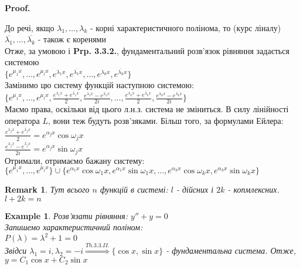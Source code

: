 \documentclass[a4paper, 10pt]{article}
\makeatletter
\def\qed{$\blacksquare$}
\theoremstyle{theoremdd}
\theoremstyle{theoremdd}
\theoremstyle{theoremdd}
\theoremstyle{theoremdd}
\newtheorem{example}[theorem]{Example}
\theoremstyle{theoremdd}
\theoremstyle{theoremdd}
\newtheorem{remark}[theorem]{Remark}
\theoremstyle{theoremdd}
\theoremstyle{theoremdd}
\renewenvironment{proof}[1][Proof.\\]{\par
\pushQED{\hfill \qed}%
\normalfont \topsep6\p@\@plus6\p@\relax
\trivlist
\item\relax
{\bfseries
#1\@addpunct{.}}\hspace\labelsep\ignorespaces
}{%
\popQED\endtrivlist\@endpefalse
}
\makeatother
\begin{document}
\begin{proof}
До речі, якщо $\lambda_1, \dots, \lambda_k$ - корні характеристичного полінома, то (курс ліналу) $\overline{\lambda_1}, \dots, \overline{\lambda_k}$ - також є коренями\\
Отже, за умовою і \textbf{Prp. 3.3.2.}, фундаментальний розв'язок рівняння задається системою\\
$\{e^{\mu_1 x}, \dots, e^{\mu_l x}, e^{\lambda_1 x}, e^{\overline{\lambda_1} x}, \dots, e^{\lambda_k x}, e^{\overline{\lambda_k} x}\}$\\
Замінимо цю систему функцій наступною системою:\\
$\displaystyle \{e^{\mu_1 x}, \dots, e^{\mu_l x}, \frac{e^{\lambda_1 x} + e^{\overline{\lambda_1} x}}{2}, \frac{e^{\lambda_1 x} - e^{\overline{\lambda_1} x}}{2i}, \dots, \frac{e^{\lambda_k x} + e^{\overline{\lambda_k} x}}{2}, \frac{e^{\lambda_k x} - e^{\overline{\lambda_k} x}}{2i}\}$\\
Маємо права, оскільки від цього л.н.з. система не зміниться. В силу лінійності оператора $L$, вони теж будуть розв'зяками. Більш того, за формулами Ейлера:\\
$\displaystyle \frac{e^{\lambda_j x} + e^{\overline{\lambda_j} x}}{2} = e^{\alpha_j x} \cos \omega_j x$\\
$\displaystyle \frac{e^{\lambda_j x} - e^{\overline{\lambda_j} x}}{2i} = e^{\alpha_j x} \sin \omega_j x$\\
Отримали, отримаємо бажану систему:\\
$\{e^{\mu_1 x}, \dots, e^{\mu_l x}\} \cup \{e^{\alpha_1 x} \cos \omega_1 x, e^{\alpha_1 x} \sin \omega_1 x, \dots, e^{\alpha_k x} \cos \omega_k x, e^{\alpha_k x} \sin \omega_k x\}$ 
\end{proof}

\begin{remark}
 Тут всього $n$ функцій в системі: $l$ - дійсних і $2k$ - копмлексних. $l + 2k = n$
 \end{remark}
 
\begin{example}
Розв'язати рівняння: $y'' + y = 0$\\
Запишемо характеристичний поліном:\\
$P(\lambda) = \lambda^2 + 1 = 0$\\
Звідси $\lambda_1 = i, \lambda_2 = -i \overset{Th. 3.3.II.}{\Rightarrow} \{\cos x, \sin x\}$ - фундаментальна система.
Отже, $y = C_1 \cos x + C_2 \sin x$
\end{example}
\end{document}
